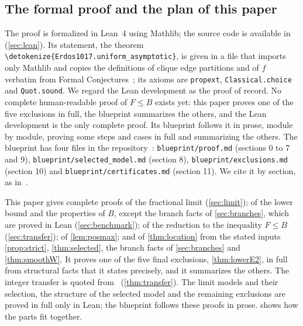\documentclass[10pt]{article}
\theoremstyle{definition}
\theoremstyle{remark}
\numberwithin{equation}{section}
\newcommand{\lean}[1]{\texttt{#1}}
\newcommand{\leanid}[1]{\expandafter\nolinkurl\expandafter{\detokenize{#1}}}
\newcommand{\Fm}[1]{\cite[#1]{Formalization}}
\begin{document}
\subsection{The formal proof and the plan of this paper}
The proof is formalized in Lean~4 using Mathlib; the source code is available in~\cite{Formalization} (\cref{sec:lean}). Its statement, the theorem \leanid{Erdos1017.uniform_asymptotic}, is given in a file that imports only Mathlib and copies the definitions of clique edge partitions and of $f$ verbatim from Formal Conjectures~\cite{FC}; its axioms are \lean{propext}, \lean{Classical.choice} and \lean{Quot.sound}. We regard the Lean development as the proof of record. No complete human-readable proof of $F\le B$ exists yet: this paper proves one of the five exclusions in full, the blueprint summarizes the others, and the Lean development is the only complete proof. Its blueprint follows it in prose, module by module, proving some steps and cases in full and summarizing the others. The blueprint has four files in the repository~\cite{Formalization}: \lean{blueprint/proof.md} (sections 0 to 7 and 9), \lean{blueprint/selected\_model.md} (section 8), \lean{blueprint/exclusions.md} (section 10) and \lean{blueprint/certificates.md} (section 11). We cite it by section, as in~\Fm{\S10.2}.

This paper gives complete proofs of the fractional limit (\cref{sec:limit}); of the lower bound and the properties of $B$, except the branch facts of \cref{sec:branches}, which are proved in Lean (\cref{sec:benchmark}); of the reduction to the inequality $F\le B$ (\cref{sec:transfer}); of \cref{lem:posmax}; and of \cref{thm:location} from the stated inputs \cref{prop:strict}, \cref{thm:selected}, the branch facts of \cref{sec:branches} and \cref{thm:smoothW}. It proves one of the five final exclusions, \cref{thm:lowerE2}, in full from structural facts that it states precisely, and it summarizes the others. The integer transfer is quoted from~\cite{BHKNW26} (\cref{thm:transfer}). The limit models and their selection, the structure of the selected model and the remaining exclusions are proved in full only in Lean; the blueprint follows these proofs in prose.  shows how the parts fit together.
\end{document}
